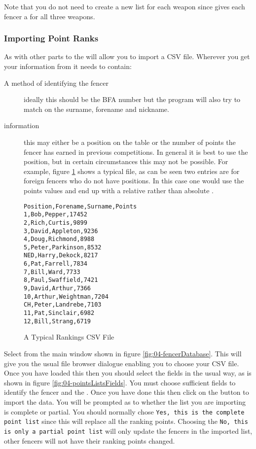 \documentclass[a4paper,11pt]{memoir}
\begin{document}
Note that you do not need to create a new list for each weapon since \fencingtime{} gives each fencer a  for all three weapons.

\subsubsection{Importing Point Ranks}

As with other parts to the  \fencingtime{} will allow you to import a CSV file. Wherever you get your information from it needs to contain:

\begin{description}
 \item[A method of identifying the fencer] ideally this should be the BFA number but the program will also try to match on the surname, forename and nickname.
 \item[ information] this may either be a position on the  table or the number of points the fencer has earned in previous competitions. In general it is best to use the position, but in certain circumstances this may not be possible. For example, figure \ref{fig:04-rankingsCSV} shows a typical  file, as can be seen two entries are for foreign fencers who do not have positions. In this case one would use the points values and end up with a relative rather than absolute .
\end{description}

\begin{figure}[!ht]
 \begin{verbatim}
Position,Forename,Surname,Points
1,Bob,Pepper,17452
2,Rich,Curtis,9899
3,David,Appleton,9236
4,Doug,Richmond,8988
5,Peter,Parkinson,8532
NED,Harry,Dekock,8217
6,Pat,Farrell,7834
7,Bill,Ward,7733
8,Paul,Swaffield,7421
9,David,Arthur,7366
10,Arthur,Weightman,7204
CH,Peter,Landrebe,7103
11,Pat,Sinclair,6982
12,Bill,Strang,6719 
 \end{verbatim}
 \caption{A Typical Rankings CSV File} \label{fig:04-rankingsCSV}
\end{figure}

Select  from the main  window shown in figure \ref{fig:04-fencerDatabase}. This will give you the usual file browser dialogue enabling you to choose your CSV file. Once you have loaded this then you should select the fields  in the usual way, as is shown in figure \ref{fig:04-pointsListsFields}. You must choose sufficient fields to identify the fencer and the . Once you have done this then click on the  button to import the data. You will be prompted as to whether the list you are importing is complete or partial. You should normally chose \texttt{Yes, this is the complete point list} since this will replace all the ranking points. Choosing the \texttt{No, this is only a partial point list} will only update the fencers in the imported list, other fencers will not have their ranking points changed.
\end{document}
